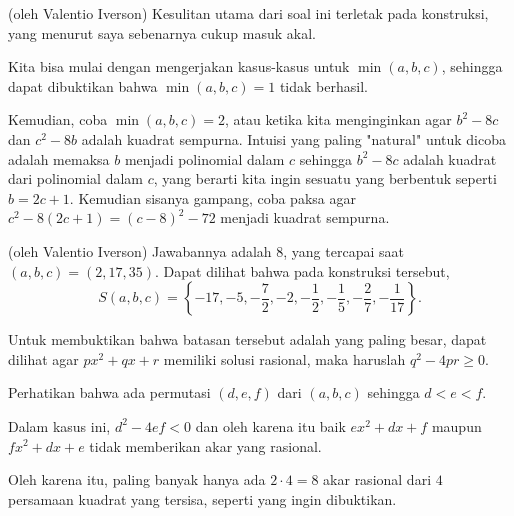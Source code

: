 
\newline

\begin{motivasi}
    (oleh Valentio Iverson) Kesulitan utama dari soal ini terletak pada konstruksi, yang menurut saya sebenarnya cukup masuk akal. 
    
    Kita bisa mulai dengan mengerjakan kasus-kasus untuk $\min(a,b,c)$, sehingga dapat dibuktikan bahwa $\min(a,b,c) = 1$ tidak berhasil.
    
    Kemudian, coba $\min(a,b,c) = 2$, atau ketika kita menginginkan agar $b^2 - 8c$ dan $c^2 - 8b$ adalah kuadrat sempurna. Intuisi yang paling "natural" untuk dicoba adalah memaksa $b$ menjadi polinomial dalam $c$ sehingga $b^2 - 8c$ adalah kuadrat dari polinomial dalam $c$, yang berarti kita ingin sesuatu yang berbentuk seperti $b = 2c + 1$. Kemudian sisanya gampang, coba paksa agar $c^2 - 8(2c + 1) = (c - 8)^2 - 72$ menjadi kuadrat sempurna.
\end{motivasi}
\begin{solusi}(oleh Valentio Iverson)
    Jawabannya adalah $\boxed{8}$, yang tercapai saat $(a,b,c) = (2,17,35)$. Dapat dilihat bahwa pada konstruksi tersebut,
    \[ S(a,b,c) = \left \{-17, - 5,  -\frac{7}{2},  -2, - \frac{1}{2},  - \frac{1}{5}, - \frac{2}{7}, - \frac{1}{17}  \right \}. \]
    
    Untuk membuktikan bahwa batasan tersebut adalah yang paling besar, dapat dilihat agar $px^2 + qx + r$ memiliki solusi rasional, maka haruslah $q^2 - 4pr \ge 0$.
    
    Perhatikan bahwa ada permutasi $(d,e,f)$ dari $(a,b,c)$ sehingga $d < e < f$. 
    
    Dalam kasus ini, $d^2 - 4ef < 0$ dan oleh karena itu baik $ex^2 + dx + f$ maupun $fx^2 + dx + e$ tidak memberikan akar yang rasional. 
    
    Oleh karena itu, paling banyak hanya ada $2 \cdot 4 = 8$ akar rasional dari $4$ persamaan kuadrat yang tersisa, seperti yang ingin dibuktikan.
\end{solusi}